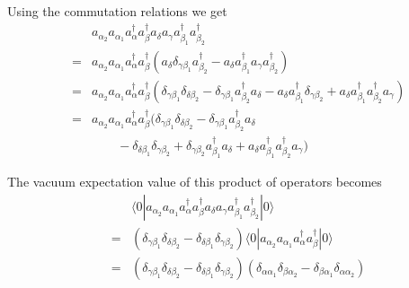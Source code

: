\documentclass[graybox,sectrefs,envcountresetchap,open=right]{svmonodo}
\begin{document}
Using the commutation relations we get 
\begin{eqnarray}
	&& a_{\alpha_2} a_{\alpha_1}a^{\dagger}_\alpha a^{\dagger}_\beta 
		a_\delta a_\gamma a_{\beta_1}^{\dagger} a_{\beta_2}^{\dagger} \nonumber \\
	&=& a_{\alpha_2} a_{\alpha_1}a^{\dagger}_\alpha a^{\dagger}_\beta 
		( a_\delta \delta_{\gamma \beta_1} a_{\beta_2}^{\dagger} - 
		a_\delta  a_{\beta_1}^{\dagger} a_\gamma a_{\beta_2}^{\dagger} ) \nonumber \\
	&=& a_{\alpha_2} a_{\alpha_1}a^{\dagger}_\alpha a^{\dagger}_\beta 
		(\delta_{\gamma \beta_1} \delta_{\delta \beta_2} - \delta_{\gamma \beta_1} a_{\beta_2}^{\dagger} a_\delta -
		a_\delta a_{\beta_1}^{\dagger}\delta_{\gamma \beta_2} +
		a_\delta a_{\beta_1}^{\dagger} a_{\beta_2}^{\dagger} a_\gamma ) \nonumber \\
	&=& a_{\alpha_2} a_{\alpha_1}a^{\dagger}_\alpha a^{\dagger}_\beta 
		(\delta_{\gamma \beta_1} \delta_{\delta \beta_2} - \delta_{\gamma \beta_1} a_{\beta_2}^{\dagger} a_\delta \nonumber \\
		&& \qquad - \delta_{\delta \beta_1} \delta_{\gamma \beta_2} + \delta_{\gamma \beta_2} a_{\beta_1}^{\dagger} a_\delta
		+ a_\delta a_{\beta_1}^{\dagger} a_{\beta_2}^{\dagger} a_\gamma ) \label{eq:2-41}
\end{eqnarray}




The vacuum expectation value of this product of operators becomes
\begin{eqnarray}
	&& \langle 0|a_{\alpha_2} a_{\alpha_1} a^{\dagger}_\alpha a^{\dagger}_\beta a_\delta a_\gamma 
		a_{\beta_1}^{\dagger} a_{\beta_2}^{\dagger}|0\rangle \nonumber \\
	&=& (\delta_{\gamma \beta_1} \delta_{\delta \beta_2} -
		\delta_{\delta \beta_1} \delta_{\gamma \beta_2} ) 
		\langle 0|a_{\alpha_2} a_{\alpha_1}a^{\dagger}_\alpha a^{\dagger}_\beta|0\rangle \nonumber \\
	&=& (\delta_{\gamma \beta_1} \delta_{\delta \beta_2} -\delta_{\delta \beta_1} \delta_{\gamma \beta_2} )
	(\delta_{\alpha \alpha_1} \delta_{\beta \alpha_2} -\delta_{\beta \alpha_1} \delta_{\alpha \alpha_2} ) \label{eq:2-42b}
\end{eqnarray}
\end{document}
